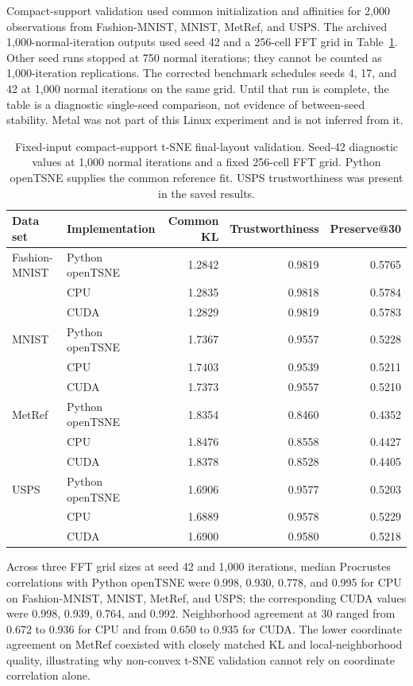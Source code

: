 \documentclass[article]{jss}
\newcommand{\fastEmbedR}{\pkg{fastEmbedR}\xspace}
\begin{document}
Compact-support validation used common initialization and affinities for
2,000 observations from Fashion-MNIST, MNIST, MetRef, and USPS. The archived
1,000-normal-iteration outputs used seed 42 and a 256-cell FFT grid in
Table~\ref{tab:tsne-final-layout}. Other seed runs stopped at 750 normal
iterations; they cannot be counted as 1,000-iteration replications. The
corrected benchmark schedules seeds 4, 17, and 42 at 1,000 normal iterations
on the same grid. Until that run is complete, the table is a diagnostic
single-seed comparison, not evidence of between-seed stability. Metal was not
part of this Linux experiment and is not inferred from it.

\begin{table}[t]
\centering
\caption{Fixed-input compact-support t-SNE final-layout validation.
  Seed-42 diagnostic values at 1,000 normal iterations and a fixed 256-cell
  FFT grid. Python openTSNE supplies the common reference fit. USPS
  trustworthiness was present in the saved results.}
\label{tab:tsne-final-layout}
\scriptsize
\begin{tabular}{llrrr}
\toprule
Data set & Implementation & Common KL & Trustworthiness & Preserve@30 \\
\midrule
Fashion-MNIST & Python openTSNE & 1.2842 & 0.9819 & 0.5765 \\
 & \fastEmbedR CPU & 1.2835 & 0.9818 & 0.5784 \\
 & \fastEmbedR CUDA & 1.2829 & 0.9819 & 0.5783 \\
MNIST & Python openTSNE & 1.7367 & 0.9557 & 0.5228 \\
 & \fastEmbedR CPU & 1.7403 & 0.9539 & 0.5211 \\
 & \fastEmbedR CUDA & 1.7373 & 0.9557 & 0.5210 \\
MetRef & Python openTSNE & 1.8354 & 0.8460 & 0.4352 \\
 & \fastEmbedR CPU & 1.8476 & 0.8558 & 0.4427 \\
 & \fastEmbedR CUDA & 1.8378 & 0.8528 & 0.4405 \\
USPS & Python openTSNE & 1.6906 & 0.9577 & 0.5203 \\
 & \fastEmbedR CPU & 1.6889 & 0.9578 & 0.5229 \\
 & \fastEmbedR CUDA & 1.6900 & 0.9580 & 0.5218 \\
\bottomrule
\end{tabular}
\end{table}

Across three FFT grid sizes at seed 42 and 1,000 iterations, median
Procrustes correlations with Python openTSNE were
0.998, 0.930, 0.778, and 0.995 for CPU on Fashion-MNIST, MNIST, MetRef, and
USPS; the corresponding CUDA values were 0.998, 0.939, 0.764, and 0.992.
Neighborhood agreement at 30 ranged from 0.672 to 0.936 for CPU and from
0.650 to 0.935 for CUDA. The lower coordinate agreement on MetRef coexisted
with closely matched KL and local-neighborhood quality, illustrating why
non-convex t-SNE validation cannot rely on coordinate correlation alone.
\end{document}
